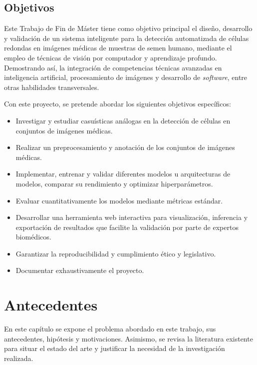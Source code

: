 \documentclass[12pt,a4paper,onecolumn,oneside]{report}
\begin{document}
\section{Objetivos}
\label{sec:Objetivos}

Este Trabajo de Fin de Máster tiene como objetivo principal el diseño, desarrollo y validación de un sistema inteligente para la detección automatizada de células redondas en imágenes médicas de muestras de semen humano,
mediante el empleo de técnicas de visión por computador y aprendizaje profundo. 
Demostrando así, la integración de competencias técnicas avanzadas en inteligencia artificial, procesamiento de imágenes y desarrollo de \textit{software}, entre otras habilidades transversales. 

Con este proyecto, se pretende abordar los siguientes objetivos específicos: 

\begin{itemize}
  \item Investigar y estudiar casuísticas análogas en la detección de células en conjuntos de imágenes médicas.
  \item Realizar un preprocesamiento y anotación de los conjuntos de imágenes médicas.
  \item Implementar, entrenar y validar diferentes modelos u arquitecturas de modelos, comparar su rendimiento y optimizar hiperparámetros.
  \item Evaluar cuantitativamente los modelos mediante métricas estándar.
  \item Desarrollar una herramienta web interactiva para visualización, inferencia y exportación de resultados que facilite la validación por parte de expertos biomédicos.
  \item Garantizar la reproducibilidad y cumplimiento ético y legislativo.
  \item Documentar exhaustivamente el proyecto.
\end{itemize}


\chapter{Antecedentes} %
\label{Antecedentes}

En este capítulo se expone el problema abordado en este trabajo, sus antecedentes, hipótesis y motivaciones. 
Asimismo, se revisa la literatura existente para situar el estado del arte y justificar la necesidad de la investigación realizada.
\end{document}

